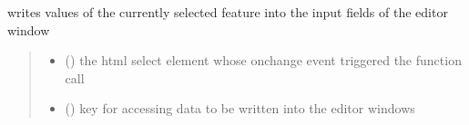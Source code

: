 \documentclass[letterpaper,10pt,english]{sphinxmanual}
\begin{document}

\begin{fulllineitems}
\label{\detokenize{docs_gui/js_api/network_editor/display_editable_network_features:fillSelectedEditableNetworkFeatureEditor}}
\pysigstartsignatures
{}
\pysigstopsignatures
\sphinxAtStartPar
writes values of the currently selected feature into the input fields of the editor window
\begin{quote}\begin{description}
\begin{itemize}
\item {} 
\sphinxAtStartPar
{} () \textendash{} the html select element whose onchange event triggered the function call

\item {} 
\sphinxAtStartPar
{} () \textendash{} key for accessing data to be written into the editor windows

\end{itemize}

\end{description}\end{quote}

\end{fulllineitems}

\end{document}
